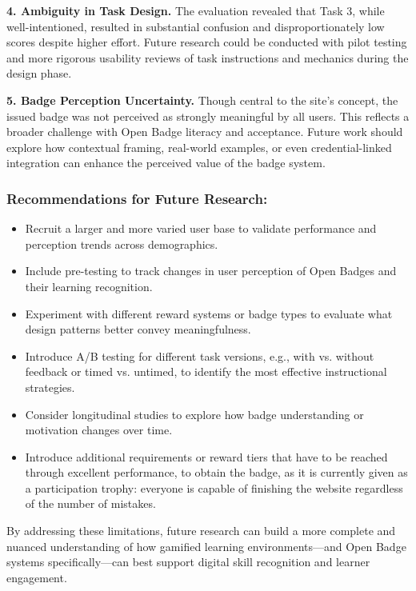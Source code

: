 \textbf{4. Ambiguity in Task Design.}
The evaluation revealed that Task 3, while well-intentioned, resulted in substantial confusion and disproportionately low scores despite higher effort. 
Future research could be conducted with pilot testing and more rigorous usability reviews of task instructions and mechanics during the design phase.

\textbf{5. Badge Perception Uncertainty.}
Though central to the site's concept, the issued badge was not perceived as strongly meaningful by all users. 
This reflects a broader challenge with Open Badge literacy and acceptance. 
Future work should explore how contextual framing, real-world examples, or even credential-linked integration can enhance the perceived value of the badge system. 

\subsubsection{Recommendations for Future Research:}
\begin{itemize}
\item Recruit a larger and more varied user base to validate performance and perception trends across demographics.
\item Include pre-testing to track changes in user perception of Open Badges and their learning recognition.
\item Experiment with different reward systems or badge types to evaluate what design patterns better convey meaningfulness.
\item Introduce A/B testing for different task versions, e.g., with vs. without feedback or timed vs. untimed, to identify the most effective instructional strategies.
\item Consider longitudinal studies to explore how badge understanding or motivation changes over time.
\item Introduce additional requirements or reward tiers that have to be reached through excellent performance, to obtain the badge, as it is currently given as a participation trophy: everyone is capable of finishing the website regardless of the number of mistakes.
\end{itemize}

By addressing these limitations, future research can build a more complete and nuanced understanding of how gamified learning environments—and Open Badge systems specifically—can best support digital skill recognition and learner engagement.

\newpage